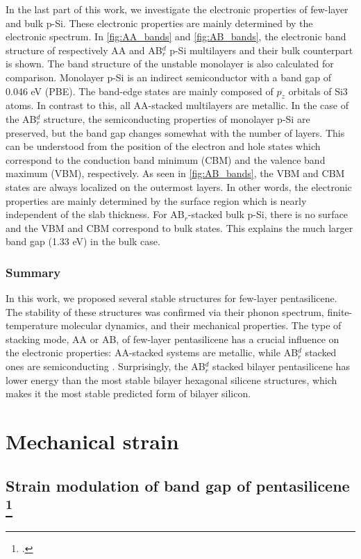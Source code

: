 In the last part of this work, we investigate the electronic properties of few-layer and bulk p-Si. These electronic properties are mainly determined by the electronic spectrum. In \autoref{fig:AA_bands} and \autoref{fig:AB_bands}, the electronic band structure of respectively AA and AB$_r^d$ p-Si multilayers and their bulk counterpart is shown. The band structure of the unstable monolayer is also calculated for comparison. Monolayer p-Si is an indirect semiconductor with a band gap of 0.046 eV (PBE). The band-edge states are mainly composed of $p_z$ orbitals of Si3 atoms. In contrast to this, all AA-stacked multilayers are metallic. In the case of the AB$_r^d$ structure, the semiconducting properties of monolayer p-Si are preserved, but the band gap changes somewhat with the number of layers. This can be understood from the position of the electron and hole states which correspond to the conduction band minimum (CBM) and the valence band maximum (VBM), respectively. As seen in \autoref{fig:AB_bands}, the VBM and CBM states are always localized on the outermost layers. In other words, the electronic properties are mainly determined by the surface region which is nearly independent of the slab thickness. For AB$_r$-stacked bulk p-Si, there is no surface and the VBM and CBM correspond to bulk states. This explains the much larger band gap (1.33 eV) in the bulk case. 


\subsubsection{Summary\label{conc}}

In this work, we proposed several stable structures for few-layer pentasilicene. The stability of these structures was confirmed via their phonon spectrum, finite-temperature molecular dynamics, and their mechanical properties. The type of stacking mode, AA or AB, of few-layer pentasilicene has a crucial influence on the electronic properties: AA-stacked systems are metallic, while AB$_r^d$ stacked ones are semiconducting . Surprisingly, the AB$_r^d$ stacked bilayer pentasilicene has lower energy than the most stable bilayer hexagonal silicene structures, which makes it the most stable predicted form of bilayer silicon.  


\section{Mechanical strain}

\subsection[Strain modulation of band gap of pentasilicene]{Strain modulation of band gap of pentasilicene \footcite[This work is published in:][]{Aierken2016.pentasilicene}}


